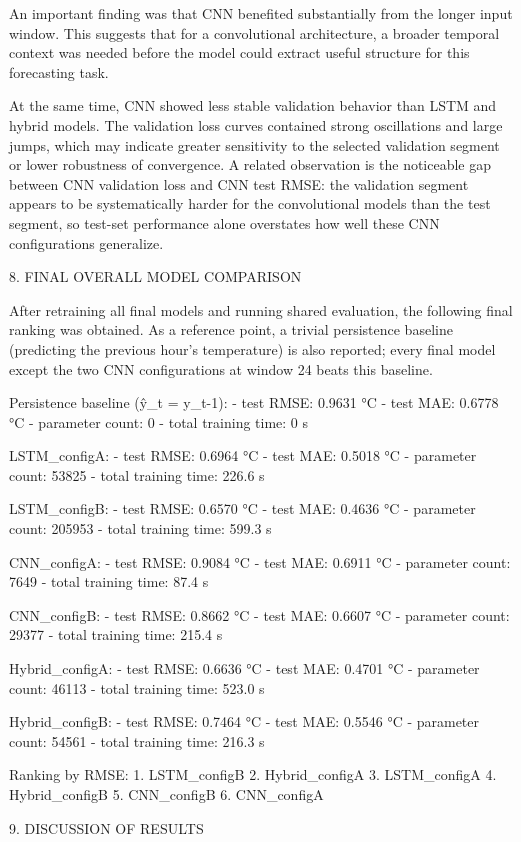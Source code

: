 An important finding was that CNN benefited substantially from the longer input window. This suggests that for a convolutional architecture, a broader temporal context was needed before the model could extract useful structure for this forecasting task.

At the same time, CNN showed less stable validation behavior than LSTM and hybrid models. The validation loss curves contained strong oscillations and large jumps, which may indicate greater sensitivity to the selected validation segment or lower robustness of convergence. A related observation is the noticeable gap between CNN validation loss and CNN test RMSE: the validation segment appears to be systematically harder for the convolutional models than the test segment, so test-set performance alone overstates how well these CNN configurations generalize.

8. FINAL OVERALL MODEL COMPARISON

After retraining all final models and running shared evaluation, the following final ranking was obtained. As a reference point, a trivial persistence baseline (predicting the previous hour's temperature) is also reported; every final model except the two CNN configurations at window 24 beats this baseline.

Persistence baseline (ŷ_t = y_{t-1}):
- test RMSE: 0.9631 °C
- test MAE: 0.6778 °C
- parameter count: 0
- total training time: 0 s

LSTM_configA:
- test RMSE: 0.6964 °C
- test MAE: 0.5018 °C
- parameter count: 53825
- total training time: 226.6 s

LSTM_configB:
- test RMSE: 0.6570 °C
- test MAE: 0.4636 °C
- parameter count: 205953
- total training time: 599.3 s

CNN_configA:
- test RMSE: 0.9084 °C
- test MAE: 0.6911 °C
- parameter count: 7649
- total training time: 87.4 s

CNN_configB:
- test RMSE: 0.8662 °C
- test MAE: 0.6607 °C
- parameter count: 29377
- total training time: 215.4 s

Hybrid_configA:
- test RMSE: 0.6636 °C
- test MAE: 0.4701 °C
- parameter count: 46113
- total training time: 523.0 s

Hybrid_configB:
- test RMSE: 0.7464 °C
- test MAE: 0.5546 °C
- parameter count: 54561
- total training time: 216.3 s

Ranking by RMSE:
1. LSTM_configB
2. Hybrid_configA
3. LSTM_configA
4. Hybrid_configB
5. CNN_configB
6. CNN_configA

9. DISCUSSION OF RESULTS

